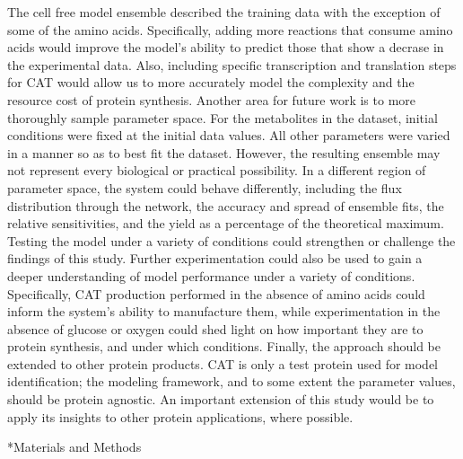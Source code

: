 \documentclass[12pt]{article}
\makeatletter
\renewcommand\section{\@startsection
	{subsection}{2}{0mm}
	{-0.2in}
	{0.05\baselineskip}
	{\normalfont\large\bfseries}}
\makeatother
\begin{document}
The cell free model ensemble described the training data with the exception of some of the amino acids.
Specifically, adding more reactions that consume amino acids would improve the model's ability to predict those that show a decrase in the experimental data.
Also, including specific transcription and translation steps for CAT would allow us to more accurately model the complexity and the resource cost of protein synthesis.
Another area for future work is to more thoroughly sample parameter space.
For the metabolites in the dataset, initial conditions were fixed at the initial data values.
All other parameters were varied in a manner so as to best fit the dataset.
However, the resulting ensemble may not represent every biological or practical possibility.
In a different region of parameter space, the system could behave differently, including the flux distribution through the network, the accuracy and spread of ensemble fits, the relative sensitivities, and the yield as a percentage of the theoretical maximum.
Testing the model under a variety of conditions could strengthen or challenge the findings of this study.
Further experimentation could also be used to gain a deeper understanding of model performance under a variety of conditions.
Specifically, CAT production performed in the absence of amino acids could inform the system's ability to manufacture them, while experimentation in the absence of glucose or oxygen could shed light on how important they are to protein synthesis, and under which conditions.
Finally, the approach should be extended to other protein products.
CAT is only a test protein used for model identification; the modeling framework, and to some extent the parameter values, should be protein agnostic.
An important extension of this study would be to apply its insights to other protein applications, where possible.

\clearpage

\section*{Materials and Methods}
\end{document}
